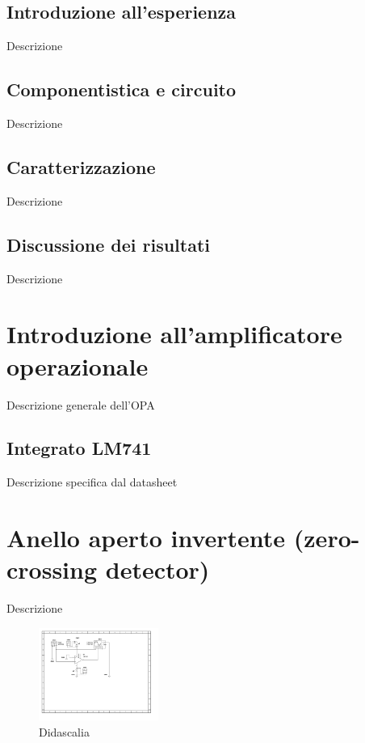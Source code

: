 \documentclass[journal]{IEEEtran}
\begin{document}
\subsection{\textbf{Introduzione all'esperienza}}
Descrizione

\subsection{\textbf{Componentistica e circuito}}
Descrizione

\subsection{\textbf{Caratterizzazione}}
Descrizione

\subsection{\textbf{Discussione dei risultati}}
Descrizione


\section{\textbf{Introduzione all'amplificatore operazionale}}
Descrizione generale dell'OPA %

\subsection{\textbf{Integrato LM741}}
Descrizione specifica dal datasheet


\section{\textbf{Anello aperto invertente (zero-crossing detector)}} %
Descrizione

\begin{figure}[H]%
\begin {center}
\includegraphics[width=0.35\textwidth]{sch-simulations/output/OPA-open-loop-inverting.pdf}
\caption{Didascalia}
\label{fig:oscilloscope}
\end {center}
\end{figure}
\end{document}
